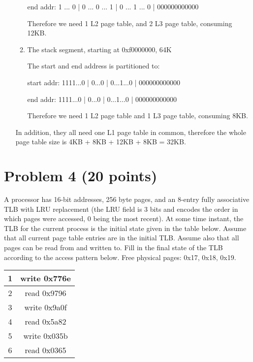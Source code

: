 \documentclass[answers]{exam}
\begin{document}
\begin{itemize}
\begin{enumerate}
    end addr: 1 ... 0 | 0 ... 0 ... 1 | 0 ... 1 ... 0 | 000000000000

    Therefore we need 1 L2 page table, and 2 L3 page table, consuming 12KB.

    \item The stack segment, starting at 0xf0000000, 64K
    
    The start and end address is partitioned to:

    start addr: 1111...0 | 0...0 | 0...1...0 | 000000000000

    end addr: 1111...0 | 0...0 | 0...1...0 | 000000000000

    Therefore we need 1 L2 page table and 1 L3 page table, consuming 8KB.

  \end{enumerate}

  In addition, they all need one L1 page table in common, therefore the whole page table size is 4KB + 8KB + 12KB + 8KB = 32KB.


\end{itemize}



\newpage
\section*{Problem 4 (20 points)}
A processor has 16-bit addresses, 256 byte pages, and an 8-entry fully associative TLB with LRU replacement (the LRU field is 3 bits and encodes the order in which pages were accessed, 0 being the most recent). At some time instant, the TLB for the current process is the initial state given in the table below. Assume that all current page table entries are in the initial TLB. Assume also that all pages can be read from and written to. Fill in the final state of the TLB according to the access pattern below. Free physical pages: 0x17, 0x18, 0x19.

\begin{table}[h!]
  \begin{center}
  \setlength{\tabcolsep}{7mm}
    \begin{tabular}{|c|c|} 
      \hline
      1&write 0x776e\\
      \hline
      2&read 0x9796\\
      \hline
      3&write 0x9a0f\\
      \hline
      4&read 0x5a82\\
      \hline
      5&write 0x035b\\
      \hline
      6&read 0x0365\\
      \hline
    \end{tabular}
  \end{center}
\end{table}
\end{document}
